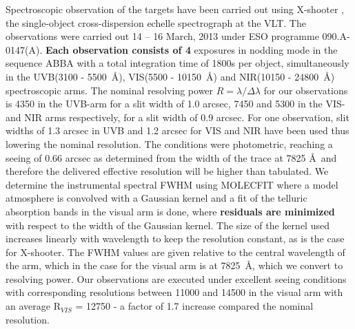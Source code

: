 \documentclass{aa}    %
\begin{document}
Spectroscopic observation of the targets have been carried out using X-shooter
\citep{Vernet2011}, the single-object cross-dispersion echelle spectrograph at
the VLT. The observations were carried out 14 -- 16 March, 2013 under ESO
programme 090.A-0147(A). \textbf{Each observation consists of 4} exposures in nodding mode in
the sequence ABBA with a total integration time of 1800s per object,
simultaneously in the UVB(3100 - 5500~\AA), VIS(5500 - 10150~\AA)  and NIR(10150
- 24800~\AA) spectroscopic arms. The nominal resolving power $R = \lambda /
\Delta \lambda$ for our observations is 4350 in the UVB-arm for a slit width of
1.0 arcsec, 7450 and 5300 in the VIS- and NIR arms respectively, for a slit
width of 0.9 arcsec. For one observation, slit widths of 1.3 arcsec in UVB and
1.2 arcsec for VIS and NIR have been used thus lowering the nominal resolution.
The conditions were photometric, reaching a seeing of 0.66 arcsec as determined
from the width of the trace at 7825 \AA~and therefore the delivered effective
resolution will be higher than tabulated. We determine the instrumental spectral
FWHM using MOLECFIT \citep{Smette2015, Kausch2015} where a model atmosphere is
convolved with a Gaussian kernel and a fit of the telluric absorption bands in
the visual arm is done, where \textbf{residuals are minimized} with respect to the
width of the Gaussian kernel. The size of the kernel used increases linearly
with wavelength to keep the resolution constant, as is the case for X-shooter.
The FWHM values are given relative to the central wavelength of the arm, which
in the case for the visual arm is at 7825~\AA, which we convert to resolving
power.
Our observations are executed under excellent seeing conditions with
corresponding resolutions between 11000 and 14500 in the visual arm with an
average R$_{VIS}$ = 12750 - a factor of 1.7 increase compared the nominal
resolution. 
\end{document}

